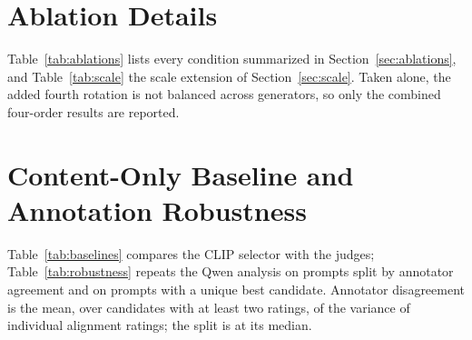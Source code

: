 \documentclass[letterpaper]{article}
\begin{document}
\section{Ablation Details}
Table~\ref{tab:ablations} lists every condition summarized in Section~\ref{sec:ablations}, and Table~\ref{tab:scale} the scale extension of Section~\ref{sec:scale}. Taken alone, the added fourth rotation is not balanced across generators, so only the combined four-order results are reported.
\begin{table}[t]
\centering

\caption{Post-hoc ablations (Qwen, 300 prompts; four orders use the 200 four-image pools). Choice changes: share of prompts whose returned image differs across orders. Unanimous: prompts where all orders return the same image.}
\label{tab:ablations}
\end{table}

\begin{table}[t]
\centering
\resizebox{\textwidth}{!}{}
\caption{Scale extension (300 prompts, three orders). The 8-bit runs use Apple MLX with the same inputs, decoding, and parser as the main run; the 8-bit 4B run controls for quantization and agrees with the main 4B run on most calls. Rejected: prompts on which the three orders disagree.}
\label{tab:scale}
\end{table}

\section{Content-Only Baseline and Annotation Robustness}
Table~\ref{tab:baselines} compares the CLIP selector with the judges; Table~\ref{tab:robustness} repeats the Qwen analysis on prompts split by annotator agreement and on prompts with a unique best candidate. Annotator disagreement is the mean, over candidates with at least two ratings, of the variance of individual alignment ratings; the split is at its median.

\begin{table}[t]
\centering

\caption{Content-only CLIP selector (argmax prompt--image similarity, position-invariant by construction) versus the judges, original order. BMR, Rand.\ BMR, and Best in \%. $\Delta$Stereotype is selected minus matched random.}
\label{tab:baselines}
\end{table}

\begin{table}[t]
\centering

\caption{Robustness to annotation consensus (exploratory). Rand.\ regret is random choice on the same prompts.}
\label{tab:robustness}
\end{table}
\end{document}
